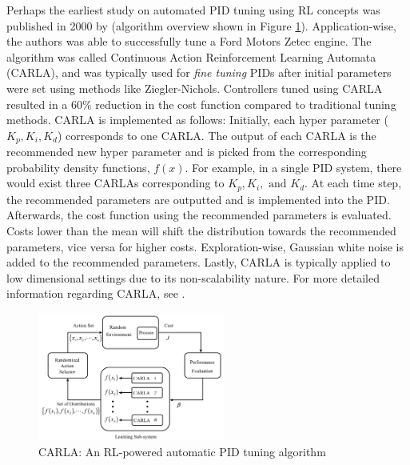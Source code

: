 Perhaps the earliest study on automated PID tuning using RL concepts was published in 2000 by \cite{pid1} (algorithm overview shown in Figure \ref{fig: CARLA}).  Application-wise, the authors was able to successfully tune a Ford Motors Zetec engine. The algorithm was called Continuous Action Reinforcement Learning Automata (CARLA), and was typically used for \textit{fine tuning} PIDs after initial parameters were set using methods like Ziegler-Nichols. Controllers tuned using CARLA resulted in a 60\% reduction in the cost function compared to traditional tuning methods.  CARLA is implemented as follows: Initially, each hyper parameter ($K_p, K_i, K_d$) corresponds to one CARLA.  The output of each CARLA is the recommended new hyper parameter and is picked from the corresponding probability density functions, $f(x)$.  For example, in a single PID system, there would exist three CARLAs corresponding to $K_p, K_i, \text{ and } K_d$. At each time step, the recommended parameters are outputted and is implemented into the PID.  Afterwards, the cost function using the recommended parameters is evaluated.  Costs lower than the mean will shift the distribution towards the recommended parameters, vice versa for higher costs. Exploration-wise, Gaussian white noise is added to the recommended parameters. Lastly, CARLA is typically applied to low dimensional settings due to its non-scalability nature. For more detailed information regarding CARLA, see \cite{pid1}.

\begin{figure}[H]
    \centering
    \includegraphics[width=0.55\textwidth]{images/ch5/CARLA.jpeg}
    \caption{CARLA: An RL-powered automatic PID tuning algorithm}
    \label{fig: CARLA}
\end{figure}

